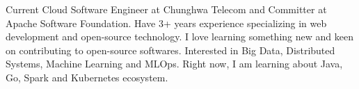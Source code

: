 

\begin{cvparagraph}

Current Cloud Software Engineer at Chunghwa Telecom and Committer at Apache Software Foundation. Have 3+ years experience specializing in web development and open-source technology. I love learning something new and keen on contributing to open-source softwares. Interested in Big Data, Distributed Systems, Machine Learning and MLOps. Right now, I am learning about Java, Go, Spark and Kubernetes ecosystem.
\end{cvparagraph}
